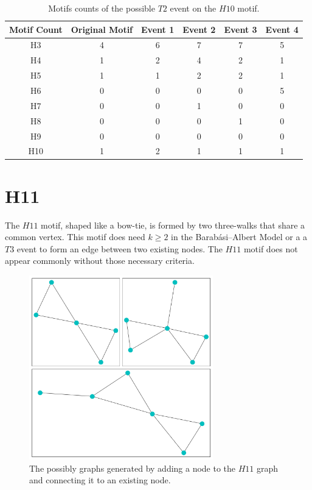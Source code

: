 \begin{table}
    \centering
    \begin{tabular}{||c c c c c c ||} 
    \hline
    Motif Count & Original Motif & Event 1 & Event 2 & Event 3  & Event 4 \\ [0.5ex] 
    \hline\hline
    H3 & 4 & 6 & 7 & 7  & 5\\
    \hline
    H4 & 1 & 2 & 4 & 2  & 1\\
    \hline
    H5 & 1 & 1 & 2 & 2 & 1\\
    \hline
    H6 & 0 & 0 & 0 & 0  & 5\\
    \hline
    H7 & 0 & 0 & 1 & 0 & 0 \\
    \hline
    H8 & 0 & 0 & 0 & 1 & 0 \\
    \hline
    H9 & 0 & 0 & 0 & 0  & 0 \\
    \hline
    H10 & 1 & 2 & 1 & 1 & 1 \\
    \hline
   \end{tabular}
   \caption{Motifs counts of the possible $T2$ event on the $H10$ motif.}
   \label{table:8}
\end{table}

\FloatBarrier

\section{H11}
The $H11$ motif, shaped like a bow-tie, is formed by two three-walks that share a common
vertex. This motif does need $k \geq 2$ in the Barabási–Albert Model or a 
 a $T3$ event to form an edge between two existing nodes. The $H11$ motif does not appear 
 commonly without those necessary criteria.

\begin{figure}[!ht]
    \includegraphics[width=8cm]{Images/H11_evolution.png}
    \centering
    \caption{The possibly graphs generated by adding a node to the $H11$ graph 
    and connecting it to an existing node.}
\end{figure}

